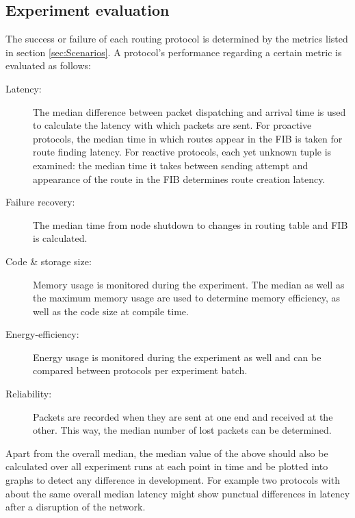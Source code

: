 \documentclass{acm_proc_article-sp}
\begin{document}
\subsection{Experiment evaluation}
\label{subsec:evaluation}
The success or failure of each routing protocol is determined by the metrics listed in section \ref{sec:Scenarios}. A protocol's performance regarding a certain metric is evaluated as follows:
\begin{description}
\item[Latency:] The median difference between packet dispatching and arrival time is used to calculate the latency with which packets are sent. For proactive protocols, the median time in which routes appear in the \gls{FIB} is taken for route finding latency. For reactive protocols, each yet unknown tuple is examined: the median time it takes between sending attempt and appearance of the route in the FIB determines route creation latency.
\item[Failure recovery:] The median time from node shutdown to changes in routing table and \gls{FIB} is calculated.
\item[Code \& storage size:] Memory usage is monitored during the experiment. The median as well as the maximum memory usage are used to determine memory efficiency, as well as the code size at compile time. %
\item[Energy-efficiency:] Energy usage is monitored during the experiment as well and can be compared between protocols per experiment batch.
\item[Reliability:] Packets are recorded when they are sent at one end and received at the other. This way, the median number of lost packets can be determined.
\end{description}

Apart from the overall median, the median value of the above should also be calculated over all experiment runs at each point in time and be plotted into graphs to detect any difference in development. For example two protocols with about the same overall median latency might show punctual differences in latency after a disruption of the network.
\end{document}
